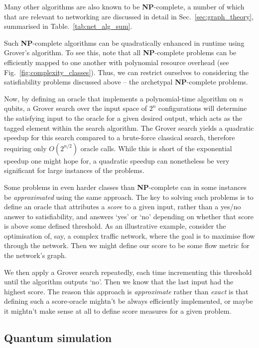 Many other algorithms are also known to be \textbf{NP}-complete, a number of which that are relevant to networking are discussed in detail in Sec.~\ref{sec:graph_theory}, summarised in Table.~\ref{tab:net_alg_sum}.

Such \textbf{NP}-complete algorithms can be quadratically enhanced in runtime using Grover's algorithm. To see this, note that all \textbf{NP}-complete problems can be efficiently mapped to one another with polynomial resource overhead (see Fig.~\ref{fig:complexity_classes}). Thus, we can restrict ourselves to considering the satisfiability problems discussed above -- the archetypal \textbf{NP}-complete problems.

Now, by defining an oracle that implements a polynomial-time algorithm on $n$ qubits, a Grover search over the input space of $2^n$ configurations will determine the satisfying input to the oracle for a given desired output, which acts as the tagged element within the search algorithm. The Grover search yields a quadratic speedup for this search compared to a brute-force classical search, therefore requiring only $O(2^{n/2})$ oracle calls. While this is short of the exponential speedup one might hope for, a quadratic speedup can nonetheless be very significant for large instances of the problems.

Some problems in even harder classes than \textbf{NP}-complete can in some instances be \textit{approximated} using the same approach. The key to solving such problems is to define an oracle that attributes a \textit{score} to a given input, rather than a yes/no answer to satisfiability, and answers `yes' or `no' depending on whether that score is above some defined threshold. As an illustrative example, consider the optimisation of, say, a complex traffic network, where the goal is to maximise flow through the network. Then we might define our score to be some flow metric for the network's graph.

We then apply a Grover search repeatedly, each time incrementing this threshold until the algorithm outputs `no'. Then we know that the last input had the highest score. The reason this approach is \textit{approximate} rather than \textit{exact} is that defining such a score-oracle mightn't be always efficiently implemented, or maybe it mightn't make sense at all to define score measures for a given problem.

%
%

\subsection{Quantum simulation} \label{sec:quantum_sim_alg}

